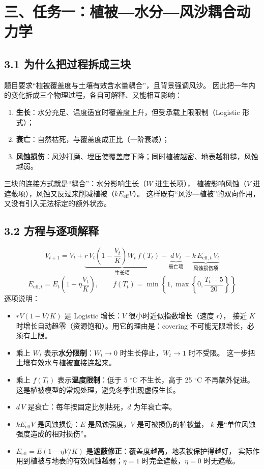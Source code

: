 \documentclass[11pt,a4paper]{ctexart}
\begin{document}
\section*{三、任务一：植被—水分—风沙耦合动力学}

\subsection*{3.1 为什么把过程拆成三块}
题目要求“植被覆盖度与土壤有效含水量耦合”，且背景强调风沙。
因此把一年内的变化拆成三个物理过程，各自可解释、又能相互影响：
\begin{enumerate}
\item \textbf{生长}：水分充足、温度适宜时覆盖度上升，但受承载上限限制（Logistic 形式）；
\item \textbf{衰亡}：自然枯死，与覆盖度成正比（一阶衰减）；
\item \textbf{风蚀损伤}：风沙打磨、埋压使覆盖度下降；同时植被越密、地表越粗糙，风蚀越弱。
\end{enumerate}
三块的连接方式就是“耦合”：水分影响生长（$W$ 进生长项），
植被影响风蚀（$V$ 进遮蔽项），风蚀又反过来削减植被（$kE_{\text{eff}}V$）。
这样既有“风沙—植被”的双向作用，又没有引入无法标定的额外状态。

\subsection*{3.2 方程与逐项解释}
\begin{equation}
V_{t+1}=V_t+\underbrace{r\,V_t\left(1-\frac{V_t}{K}\right)W_t\,f(T_t)}_{\text{生长项}}
-\underbrace{d\,V_t}_{\text{衰亡项}}
-\underbrace{k\,E_{\text{eff},t}\,V_t}_{\text{风蚀损伤项}}
\end{equation}
\begin{equation}
E_{\text{eff},t}=E_t\left(1-\eta\frac{V_t}{K}\right),
\qquad
f(T_t)=\min\!\left\{1,\max\!\left\{0,\frac{T_t-5}{20}\right\}\right\}
\end{equation}
逐项说明：
\begin{itemize}
\item $rV(1-V/K)$ 是 Logistic 增长：$V$ 很小时近似指数增长（速度 $r$），
接近 $K$ 时增长自动趋零（资源饱和）。用它的理由是：covering 不可能无限增长，必须有上限。
\item 乘上 $W_t$ 表示\textbf{水分限制}：$W_t\to0$ 时生长停止，$W_t\to1$ 时不受限。
这一步把土壤有效水与植被直接连起来。
\item 乘上 $f(T_t)$ 表示\textbf{温度限制}：低于 5 $^\circ$C 不生长，高于 25 $^\circ$C 不再额外促进。
这是植被模型的常规处理，避免冬季出现虚假生长。
\item $d\,V$ 是衰亡：每年按固定比例枯死，$d$ 为年衰亡率。
\item $kE_{\text{eff}}V$ 是风蚀损伤：$E$ 是风蚀强度，$V$ 是可被损伤的植被量，
$k$ 是“单位风蚀强度造成的相对损伤”。
\item $E_{\text{eff}}=E(1-\eta V/K)$ 是\textbf{遮蔽修正}：覆盖度越高，地表被保护得越好，
实际作用到植被与地表的有效风蚀越弱；$\eta=1$ 时完全遮蔽，$\eta=0$ 时无遮蔽。
\end{itemize}
\end{document}
